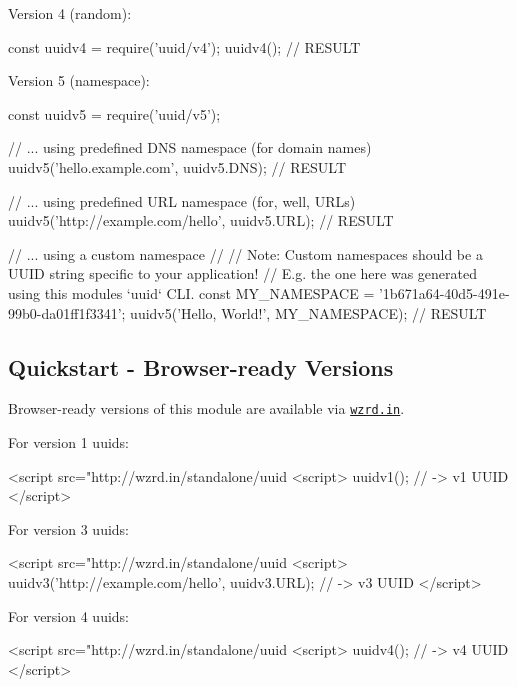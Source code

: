 Version 4 (random)\+:


\begin{DoxyCode}
const uuidv4 = require('uuid/v4');
uuidv4(); // RESULT
\end{DoxyCode}


Version 5 (namespace)\+:


\begin{DoxyCode}
const uuidv5 = require('uuid/v5');

// ... using predefined DNS namespace (for domain names)
uuidv5('hello.example.com', uuidv5.DNS); // RESULT

// ... using predefined URL namespace (for, well, URLs)
uuidv5('http://example.com/hello', uuidv5.URL); // RESULT

// ... using a custom namespace
//
// Note: Custom namespaces should be a UUID string specific to your application!
// E.g. the one here was generated using this modules `uuid` CLI.
const MY\_NAMESPACE = '1b671a64-40d5-491e-99b0-da01ff1f3341';
uuidv5('Hello, World!', MY\_NAMESPACE); // RESULT
\end{DoxyCode}


\subsection*{Quickstart -\/ Browser-\/ready Versions}

Browser-\/ready versions of this module are available via \href{https://github.com/jfhbrook/wzrd.in}{\tt wzrd.\+in}.

For version 1 uuids\+:


\begin{DoxyCode}
<script src="http://wzrd.in/standalone/uuid%
<script>
uuidv1(); // -> v1 UUID
</script>
\end{DoxyCode}


For version 3 uuids\+:


\begin{DoxyCode}
<script src="http://wzrd.in/standalone/uuid%
<script>
uuidv3('http://example.com/hello', uuidv3.URL); // -> v3 UUID
</script>
\end{DoxyCode}


For version 4 uuids\+:


\begin{DoxyCode}
<script src="http://wzrd.in/standalone/uuid%
<script>
uuidv4(); // -> v4 UUID
</script>
\end{DoxyCode}


